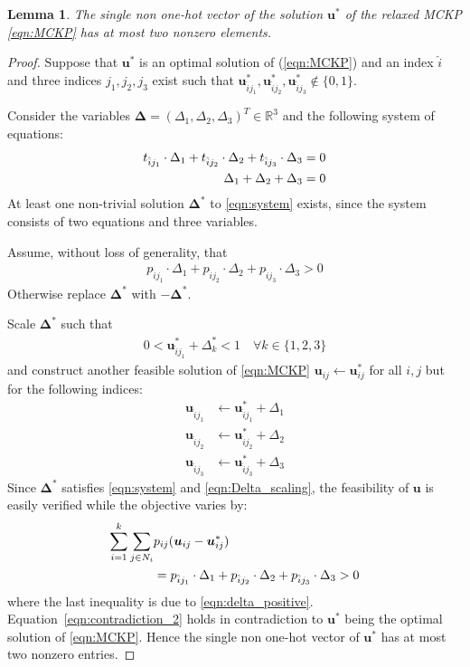 \documentclass[dvipsnames,table,xcdraw]{article}
\newtheorem{lem}[theo]{Lemma}
\newcommand{\mb}[1]{{\boldsymbol{#1}}}
\newcommand{\vu}{\mb{u}}
\newcommand{\bDelta}{\bm{\Delta}}
\begin{document}
\begin{lem}\label{lem:two_nonzeros}
The single non one-hot vector of the solution $\vu^*$ of the \textit{relaxed} MCKP \eqref{eqn:MCKP} has at most two nonzero elements.
\end{lem}

\begin{proof}
Suppose that $\vu^*$ is an optimal solution of (\ref{eqn:MCKP}) and an index $\hat{i}$ and three indices $j_1, j_2, j_3$ exist such that $\vu^*_{\hat{i} j_1}, \vu_{\hat{i} j_2}^*, \vu_{\hat{i} j_3}^*\notin\{0,1\}$. 
 
Consider the variables $\bDelta=(\Delta_1,\Delta_2,\Delta_3)^T\in\mathbb{R}^3$ and the following system of equations:
\begin{align}\label{eqn:system}
    t_{\hat{i}j_1}\cdot\Delta_1 + t_{\hat{i}j_2}\cdot\Delta_2 + t_{\hat{i}j_3}\cdot\Delta_3 &= 0\\ \notag
     \Delta_1 + \Delta_2 + \Delta_3 & = 0
\end{align}
At least one non-trivial solution $\bDelta^*$ to \eqref{eqn:system} exists, since the system consists of two equations and three variables. 

Assume, without loss of generality, that
\begin{align}\label{eqn:delta_positive}
    p_{\hat{i}j_1}\cdot\Delta_1 + p_{\hat{i}j_2}\cdot\Delta_2 + p_{\hat{i}j_3}\cdot\Delta_3 > 0
\end{align}
Otherwise replace $\bDelta^*$ with $-\bDelta^*$.

Scale $\bDelta^*$ such that
\begin{align}\label{eqn:Delta_scaling}
 0<\vu_{\hat{i} j_1}^*+\Delta_k^*<1 \quad \forall k\in\{1,2,3\}
\end{align}
 and construct another feasible solution of \eqref{eqn:MCKP} $\vu_{ij}\leftarrow\vu_{ij}^*$ for all $i,j$ but for the following indices:
 \begin{align*}
     \vu_{\hat{i} j_1}&\leftarrow\vu_{\hat{i} j_1}^*+\Delta_1 \\
     \vu_{\hat{i} j_2}&\leftarrow\vu_{\hat{i} j_2}^*+\Delta_2 \\
     \vu_{\hat{i} j_3}&\leftarrow\vu_{\hat{i} j_3}^*+\Delta_3
 \end{align*}
Since $\bDelta^*$ satisfies \eqref{eqn:system} and \eqref{eqn:Delta_scaling}, the feasibility of $\vu$ is easily verified while the objective varies by:
 \begin{align}\label{eqn:contradiction_2}
 \notag
 \sum_{i=1}^k \sum_{j\in N_i}& p_{ij} (\vu_{ij}-\vu_{ij}^*) \notag\\
    &=p_{\hat{i}j_1}\cdot\Delta_1 + p_{\hat{i}j_2}\cdot\Delta_2 + p_{\hat{i}j_3}\cdot\Delta_3 > 0
 \end{align}
where the last inequality is due to \eqref{eqn:delta_positive}. 
 Equation~\eqref{eqn:contradiction_2} holds in contradiction to $\vu^*$ being the optimal solution of \eqref{eqn:MCKP}. Hence the single non one-hot vector of $\vu^*$ has at most two nonzero entries.
\end{proof}
\end{document}
